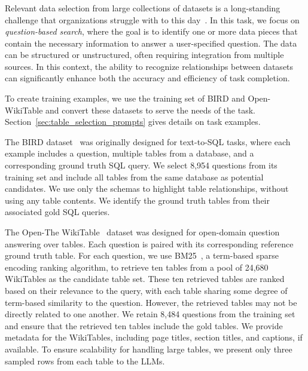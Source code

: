 \subsubsection{\datadiscovery}
\label{sec:chapter3_table_selection}
Relevant data selection from large collections of datasets is a long-standing challenge that organizations struggle with to this day~\citep{hulsebos2024took}. In this task, we focus on \textit{question-based search}, where the goal is to identify one or more data pieces that contain the necessary information to answer a user-specified question. The data can be structured or unstructured, often requiring integration from multiple sources. In this context, the ability to recognize relationships between datasets can significantly enhance both the accuracy and efficiency of task completion.

%
To create training examples, we use the training set of BIRD and Open-WikiTable and convert these datasets to serve the needs of the \datadiscovery task.  Section~\ref{sec:table_selection_prompts} gives details on task examples.

The BIRD dataset~\citep{bird} was originally designed for text-to-SQL tasks, where each example includes a question, multiple tables from a database, and a corresponding ground truth SQL query. We select 8,954 questions from its training set and include all tables from the same database as potential candidates. We use only the schemas to highlight table relationships, without using any table contents. We identify the ground truth tables from their associated gold SQL queries. 


 The Open-The WikiTable~\cite{open_wikitable} dataset was designed for open-domain question answering over tables. Each question is paired with its corresponding reference ground truth table. For each question, we use BM25~\citep{bm25}, a term-based sparse encoding ranking algorithm, to retrieve ten tables from a pool of 24,680 WikiTables as the candidate table set. These ten retrieved tables are ranked based on their relevance to the query, with each table sharing some degree of term-based similarity to the question. However, the retrieved tables may not be directly related to one another. 
We retain 8,484 questions from the training set and ensure that the retrieved ten tables include the gold tables. We provide metadata for the WikiTables, including page titles, section titles, and captions, if available. To ensure scalability for handling large tables, we present only three sampled rows from each table to the LLMs. 

